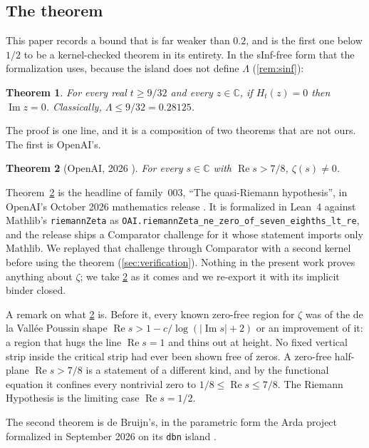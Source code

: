 \documentclass[11pt]{article}
\newtheorem{theorem}{Theorem}
\theoremstyle{definition}
\newcommand{\lean}[1]{\texttt{#1}}
\newcommand{\Lam}{\Lambda}
\newcommand{\Hfun}{H}
\newcommand{\re}{\operatorname{Re}}
\newcommand{\im}{\operatorname{Im}}
\newcommand{\C}{\mathbb{C}}
\begin{document}
\subsection{The theorem}

This paper records a bound that is far weaker than $0.2$, and is the first one below $1/2$ to be a kernel-checked theorem in its entirety. In the sInf-free form that the formalization uses, because the island does not define $\Lam$ (\cref{rem:sinf}):

\begin{theorem}\label{thm:main}
For every real $t \ge 9/32$ and every $z \in \C$, if $\Hfun_t(z) = 0$ then $\im z = 0$. Classically, $\Lam \le 9/32 = 0.28125$.
\end{theorem}

The proof is one line, and it is a composition of two theorems that are not ours. The first is OpenAI's.

\begin{theorem}[OpenAI, 2026 \cite{OAIqrh,OAImath}]\label{thm:qrh}
For every $s \in \C$ with $\re s > 7/8$, $\zeta(s) \ne 0$.
\end{theorem}

Theorem~\ref{thm:qrh} is the headline of family~003, ``The quasi-Riemann hypothesis'', in OpenAI's October 2026 mathematics release \cite{OAImath}. It is formalized in Lean~4 against Mathlib's \lean{riemannZeta} as \lean{OAI.riemannZeta\_ne\_zero\_of\_seven\_eighths\_lt\_re}, and the release ships a Comparator challenge for it whose statement imports only Mathlib. We replayed that challenge through Comparator with a second kernel before using the theorem (\cref{sec:verification}). Nothing in the present work proves anything about $\zeta$; we take \cref{thm:qrh} as it comes and we re-export it with its implicit binder closed.

A remark on what \cref{thm:qrh} is. Before it, every known zero-free region for $\zeta$ was of the de la Vall\'ee Poussin shape $\re s > 1 - c/\log(|{\im s}| + 2)$ or an improvement of it: a region that hugs the line $\re s = 1$ and thins out at height. No fixed vertical strip inside the critical strip had ever been shown free of zeros. A zero-free half-plane $\re s > 7/8$ is a statement of a different kind, and by the functional equation it confines every nontrivial zero to $1/8 \le \re s \le 7/8$. The Riemann Hypothesis is the limiting case $\re s = 1/2$.

The second theorem is de Bruijn's, in the parametric form the Arda project formalized in September 2026 on its \lean{dbn} island \cite{Arda}.
\end{document}

